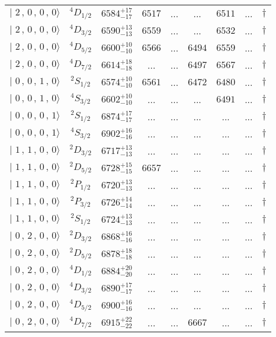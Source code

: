 \begin{tabular}{c c| c c c c c c c}
$\vert \,\,2\,,\,0\,,\,0\,,\,0 \rangle $ & $^{4}D_{1/2}$ & $6584^{+17}_{-17}$ & $6517$ & ... & ... & $6511$ & ... & $\dagger$ \\ 
$\vert \,\,2\,,\,0\,,\,0\,,\,0 \rangle $ & $^{4}D_{3/2}$ & $6590^{+13}_{-13}$ & $6559$ & ... & ... & $6532$ & ... & $\dagger$ \\ 
$\vert \,\,2\,,\,0\,,\,0\,,\,0 \rangle $ & $^{4}D_{5/2}$ & $6600^{+10}_{-10}$ & $6566$ & ... & $6494$ & $6559$ & ... & $\dagger$ \\ 
$\vert \,\,2\,,\,0\,,\,0\,,\,0 \rangle $ & $^{4}D_{7/2}$ & $6614^{+18}_{-18}$ & ... & ... & $6497$ & $6567$ & ... & $\dagger$ \\ 
$\vert \,\,0\,,\,0\,,\,1\,,\,0 \rangle $ & $^{2}S_{1/2}$ & $6574^{+10}_{-10}$ & $6561$ & ... & $6472$ & $6480$ & ... & $\dagger$ \\ 
$\vert \,\,0\,,\,0\,,\,1\,,\,0 \rangle $ & $^{4}S_{3/2}$ & $6602^{+10}_{-10}$ & ... & ... & ... & $6491$ & ... & $\dagger$ \\ 
$\vert \,\,0\,,\,0\,,\,0\,,\,1 \rangle $ & $^{2}S_{1/2}$ & $6874^{+17}_{-17}$ & ... & ... & ... & ... & ... & $\dagger$ \\ 
$\vert \,\,0\,,\,0\,,\,0\,,\,1 \rangle $ & $^{4}S_{3/2}$ & $6902^{+16}_{-16}$ & ... & ... & ... & ... & ... & $\dagger$ \\ 
$\vert \,\,1\,,\,1\,,\,0\,,\,0 \rangle $ & $^{2}D_{3/2}$ & $6717^{+13}_{-13}$ & ... & ... & ... & ... & ... & $\dagger$ \\ 
$\vert \,\,1\,,\,1\,,\,0\,,\,0 \rangle $ & $^{2}D_{5/2}$ & $6728^{+15}_{-15}$ & $6657$ & ... & ... & ... & ... & $\dagger$ \\ 
$\vert \,\,1\,,\,1\,,\,0\,,\,0 \rangle $ & $^{2}P_{1/2}$ & $6720^{+13}_{-13}$ & ... & ... & ... & ... & ... & $\dagger$ \\ 
$\vert \,\,1\,,\,1\,,\,0\,,\,0 \rangle $ & $^{2}P_{3/2}$ & $6726^{+14}_{-14}$ & ... & ... & ... & ... & ... & $\dagger$ \\ 
$\vert \,\,1\,,\,1\,,\,0\,,\,0 \rangle $ & $^{2}S_{1/2}$ & $6724^{+13}_{-13}$ & ... & ... & ... & ... & ... & $\dagger$ \\ 
$\vert \,\,0\,,\,2\,,\,0\,,\,0 \rangle $ & $^{2}D_{3/2}$ & $6868^{+16}_{-16}$ & ... & ... & ... & ... & ... & $\dagger$ \\ 
$\vert \,\,0\,,\,2\,,\,0\,,\,0 \rangle $ & $^{2}D_{5/2}$ & $6878^{+18}_{-18}$ & ... & ... & ... & ... & ... & $\dagger$ \\ 
$\vert \,\,0\,,\,2\,,\,0\,,\,0 \rangle $ & $^{4}D_{1/2}$ & $6884^{+20}_{-20}$ & ... & ... & ... & ... & ... & $\dagger$ \\ 
$\vert \,\,0\,,\,2\,,\,0\,,\,0 \rangle $ & $^{4}D_{3/2}$ & $6890^{+17}_{-17}$ & ... & ... & ... & ... & ... & $\dagger$ \\ 
$\vert \,\,0\,,\,2\,,\,0\,,\,0 \rangle $ & $^{4}D_{5/2}$ & $6900^{+16}_{-16}$ & ... & ... & ... & ... & ... & $\dagger$ \\ 
$\vert \,\,0\,,\,2\,,\,0\,,\,0 \rangle $ & $^{4}D_{7/2}$ & $6915^{+22}_{-22}$ & ... & ... & $6667$ & ... & ... & $\dagger$ \\ 
\hline \hline
\end{tabular}
